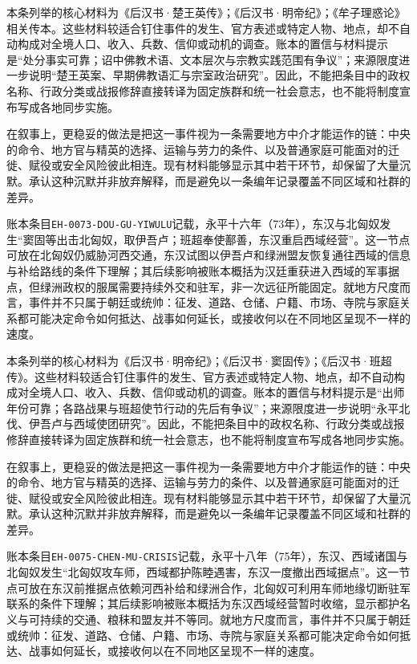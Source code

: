 本条列举的核心材料为《后汉书·楚王英传》；《后汉书·明帝纪》；《牟子理惑论》相关传本。这些材料较适合钉住事件的发生、官方表述或特定人物、地点，却不自动构成对全境人口、收入、兵数、信仰或动机的调查。账本的置信与材料提示是“处分事实可靠；诏中佛教术语、文本层次与宗教实践范围有争议”；来源限度进一步说明“楚王英案、早期佛教语汇与宗室政治研究”。因此，不能把条目中的政权名称、行政分类或战报修辞直接转译为固定族群和统一社会意志，也不能将制度宣布写成各地同步实施。

在叙事上，更稳妥的做法是把这一事件视为一条需要地方中介才能运作的链：中央的命令、地方官与精英的选择、运输与劳力的条件、以及普通家庭可能面对的迁徙、赋役或安全风险彼此相连。现有材料能够显示其中若干环节，却保留了大量沉默。承认这种沉默并非放弃解释，而是避免以一条编年记录覆盖不同区域和社群的差异。

账本条目\texttt{EH-0073-DOU-GU-YIWULU}记载，永平十六年（73年），东汉与北匈奴发生“窦固等出击北匈奴，取伊吾卢；班超奉使鄯善，东汉重启西域经营”。这一节点可放在北匈奴仍威胁河西交通，东汉试图以伊吾卢和绿洲盟友恢复通往西域的信息与补给路线的条件下理解；其后续影响被账本概括为汉廷重获进入西域的军事据点，但绿洲政权的服属需要持续外交和驻军，非一次远征所能固定。就地方尺度而言，事件并不只属于朝廷或统帅：征发、道路、仓储、户籍、市场、寺院与家庭关系都可能决定命令如何抵达、战事如何延长，或接收何以在不同地区呈现不一样的速度。

本条列举的核心材料为《后汉书·明帝纪》；《后汉书·窦固传》；《后汉书·班超传》。这些材料较适合钉住事件的发生、官方表述或特定人物、地点，却不自动构成对全境人口、收入、兵数、信仰或动机的调查。账本的置信与材料提示是“出师年份可靠；各路战果与班超使节行动的先后有争议”；来源限度进一步说明“永平北伐、伊吾卢与西域使团研究”。因此，不能把条目中的政权名称、行政分类或战报修辞直接转译为固定族群和统一社会意志，也不能将制度宣布写成各地同步实施。

在叙事上，更稳妥的做法是把这一事件视为一条需要地方中介才能运作的链：中央的命令、地方官与精英的选择、运输与劳力的条件、以及普通家庭可能面对的迁徙、赋役或安全风险彼此相连。现有材料能够显示其中若干环节，却保留了大量沉默。承认这种沉默并非放弃解释，而是避免以一条编年记录覆盖不同区域和社群的差异。

账本条目\texttt{EH-0075-CHEN-MU-CRISIS}记载，永平十八年（75年），东汉、西域诸国与北匈奴发生“北匈奴攻车师，西域都护陈睦遇害，东汉一度撤出西域据点”。这一节点可放在东汉前推据点依赖河西补给和绿洲合作，北匈奴可利用车师地缘切断驻军联系的条件下理解；其后续影响被账本概括为东汉西域经营暂时收缩，显示都护名义与可持续的交通、粮秣和盟友并不等同。就地方尺度而言，事件并不只属于朝廷或统帅：征发、道路、仓储、户籍、市场、寺院与家庭关系都可能决定命令如何抵达、战事如何延长，或接收何以在不同地区呈现不一样的速度。

